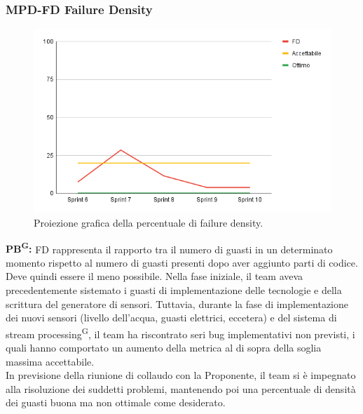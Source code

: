 \documentclass[8pt]{article}
\newcommand{\glossterm}[1]{#1\textsuperscript{G}} %
\begin{document}
\subsubsection{MPD-FD Failure Density}
\begin{figure}[h!]
    \centering
    \includegraphics[width=1\textwidth]{images_pdq/FD.png}
    \caption{Proiezione grafica della percentuale di failure density.}
    \label{fig:Proiezione grafica della percentuale di failure density}
\end{figure}
\textbf{\glossterm{PB}:} FD rappresenta il rapporto tra il numero di guasti in un determinato momento rispetto al numero di guasti presenti dopo aver aggiunto parti di codice. Deve quindi essere il meno possibile. Nella fase iniziale, il team aveva precedentemente sistemato i guasti di implementazione delle tecnologie e della scrittura del generatore di sensori. Tuttavia, durante la fase di implementazione dei nuovi sensori (livello dell'acqua, guasti elettrici, eccetera) e del sistema di \glossterm{stream processing}, il team ha riscontrato seri bug implementativi non previsti, i quali hanno comportato un aumento della metrica al di sopra della soglia massima accettabile.\\ In previsione della riunione di collaudo con la Proponente, il team si è impegnato alla risoluzione dei suddetti problemi, mantenendo poi una percentuale di densità dei guasti buona ma non ottimale come desiderato.
\clearpage
\end{document}
